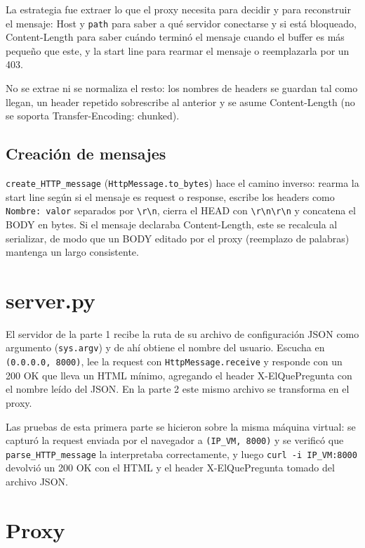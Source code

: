 \documentclass[
	spanish, %
	letterpaper, oneside
]{article}
\newcommand{\code}[1]{\texttt{#1}}    %
\newcommand{\hdr}[1]{#1}              %
\newcommand{\status}[1]{#1}           %
\begin{document}
La estrategia fue extraer lo que el proxy necesita para decidir y para reconstruir el mensaje: \hdr{Host} y \code{path} para saber a qué servidor conectarse y si está bloqueado, \hdr{Content-Length} para saber cuándo terminó el mensaje cuando el buffer es más pequeño que este, y la start line para rearmar el mensaje o reemplazarla por un \status{403}.

No se extrae ni se normaliza el resto: los nombres de headers se guardan tal como llegan, un header repetido sobrescribe al anterior y se asume \hdr{Content-Length} (no se soporta \hdr{Transfer-Encoding: chunked}).

\subsection{Creación de mensajes}
\code{create\_HTTP\_message} (\code{HttpMessage.to\_bytes}) hace el camino inverso: rearma la start line según si el mensaje es request o response, escribe los headers como \code{Nombre: valor} separados por \verb|\r\n|, cierra el HEAD con \verb|\r\n\r\n| y concatena el BODY en bytes.
Si el mensaje declaraba \hdr{Content-Length}, este se recalcula al serializar, de modo que un BODY editado por el proxy (reemplazo de palabras) mantenga un largo consistente.

\section{server.py}
El servidor de la parte 1 recibe la ruta de su archivo de configuración JSON como argumento (\code{sys.argv}) y de ahí obtiene el nombre del usuario.
Escucha en \code{(0.0.0.0, 8000)}, lee la request con \code{HttpMessage.receive} y responde con un \status{200 OK} que lleva un HTML mínimo, agregando el header \hdr{X-ElQuePregunta} con el nombre leído del JSON.
En la parte 2 este mismo archivo se transforma en el proxy.

Las pruebas de esta primera parte se hicieron sobre la misma máquina virtual: se capturó la request enviada por el navegador a \code{(IP\_VM, 8000)} y se verificó que \code{parse\_HTTP\_message} la interpretaba correctamente, y luego \code{curl -i IP\_VM:8000} devolvió un \status{200 OK} con el HTML y el header \hdr{X-ElQuePregunta} tomado del archivo JSON.

\section{Proxy}
\end{document}
